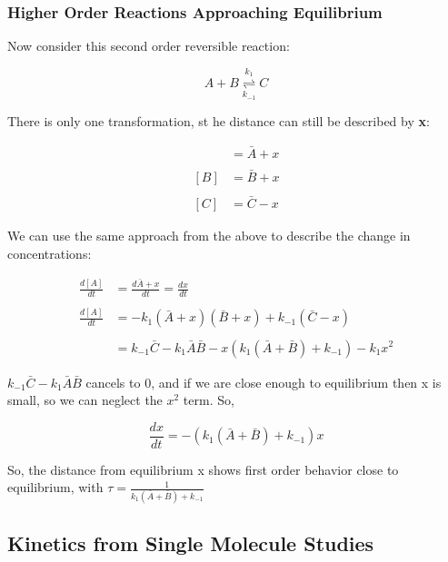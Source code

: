 \documentclass[12pt, letterpaper]{article}
\begin{document}
\subsubsection*{Higher Order Reactions Approaching Equilibrium}

Now consider this second order reversible reaction:

\begin{equation*}
    A + B \stackrel{k_1}{\underset{k_{-1}}{\rightleftharpoons}} C
\end{equation*}

There is only one transformation, st he distance can still be described by \textbf{x}:

\begin{align*}
    [A] &= \bar{A} + x \\ \\ 
    [B] &= \bar{B} + x \\ \\
    [C] &= \bar{C} - x
\end{align*}

We can use the same approach from the above to describe the change in concentrations: 

\begin{align*}
    \frac{d[A]}{dt} &= \frac{d\bar{A} + x}{dt} = \frac{dx}{dt} \\ \\
    \frac{d[A]}{dt} &= -k_1(\bar{A} + x)(\bar{B} + x) + k_{-1}(\bar{C} - x) \\ \\ 
    &= k_{-1}\bar{C} - k_1\bar{A}\bar{B} - x(k_1(\bar{A} + \bar{B}) + k_{-1}) - k_1x^2
\end{align*}

\( k_{-1}\bar{C} - k_1\bar{A}\bar{B} \) cancels to 0, and if we are close enough to equilibrium then x is small, so we can neglect the $x^2$ term. 
So, 

\begin{equation}
    \frac{dx}{dt} = -(k_1(\bar{A} + \bar{B}) + k_{-1})x
\end{equation}

So, the distance from equilibrium x shows first order behavior close to equilibrium, with \( \tau = \frac{1}{k_1(\bar{A} + \bar{B}) + k_{-1}} \)

\newpage

\subsection*{Kinetics from Single Molecule Studies}
\end{document}
